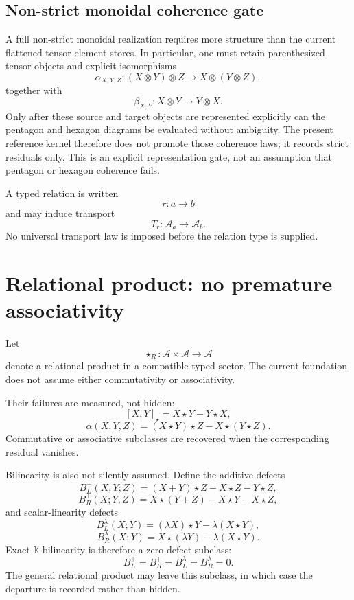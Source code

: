 \documentclass[11pt]{article}
\begin{document}
\subsection{Non-strict monoidal coherence gate}

A full non-strict monoidal realization requires more structure than the
current flattened tensor element stores. In particular, one must retain
parenthesized tensor objects and explicit isomorphisms
\[
\alpha_{X,Y,Z}:
(X\otimes Y)\otimes Z
\longrightarrow
X\otimes(Y\otimes Z),
\]
together with
\[
\beta_{X,Y}:
X\otimes Y
\longrightarrow
Y\otimes X.
\]
Only after these source and target objects are represented explicitly can the
pentagon and hexagon diagrams be evaluated without ambiguity. The present
reference kernel therefore does not promote those coherence laws; it records
strict residuals only. This is an explicit representation gate, not an
assumption that pentagon or hexagon coherence fails.

A typed relation is written
\[
r:a\to b
\]
and may induce transport
\[
\boxed{
T_r:\mathcal A_a\to\mathcal A_b.
}
\tag{DEF-T}
\]
No universal transport law is imposed before the relation type is supplied.

\section{Relational product: no premature associativity}

Let
\[
\star_R:
\mathcal A\times\mathcal A\to\mathcal A
\]
denote a relational product in a compatible typed sector. The current
foundation does not assume either commutativity or associativity.

Their failures are measured, not hidden:
\[
\boxed{
[X,Y]_{\star}
=X\star Y-Y\star X,
}
\]
\[
\boxed{
\alpha(X,Y,Z)
=(X\star Y)\star Z-X\star(Y\star Z).
}
\]
Commutative or associative subclasses are recovered when the corresponding
residual vanishes.

Bilinearity is also not silently assumed. Define the additive defects
\[
B_L^+(X,Y;Z)
=
(X+Y)\star Z-X\star Z-Y\star Z,
\]
\[
B_R^+(X;Y,Z)
=
X\star(Y+Z)-X\star Y-X\star Z,
\]
and scalar-linearity defects
\[
B_L^{\lambda}(X;Y)
=
(\lambda X)\star Y-\lambda(X\star Y),
\]
\[
B_R^{\lambda}(X;Y)
=
X\star(\lambda Y)-\lambda(X\star Y).
\]
Exact \(\mathbb K\)-bilinearity is therefore a zero-defect subclass:
\[
\boxed{
B_L^+=B_R^+=B_L^{\lambda}=B_R^{\lambda}=0.
}
\]
The general relational product may leave this subclass, in which case the
departure is recorded rather than hidden.
\end{document}
